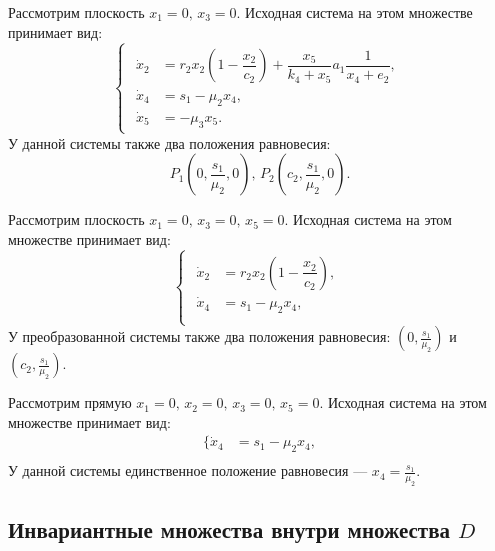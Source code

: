 \documentclass[14pt,a4paper]{extarticle}
\begin{document}
	Рассмотрим плоскость $x_1=0,\, x_3=0$. Исходная система на этом множестве принимает вид:
	\begin{equation*}
		\begin{cases}
			\begin{aligned}
				\dot{x}_2 &= r_2x_2\left(1-\dfrac{x_2}{c_2}\right)+\dfrac{x_5}{k_4+x_5}a_1\dfrac{1}{x_4+e_2},\\
				\dot{x}_4 &= s_1 -\mu_2x_4,\\
				\dot{x}_5 &= -\mu_3x_5.
			\end{aligned}
		\end{cases}
	\end{equation*}
	У данной системы также два положения равновесия:
	\[P_1\left(0,\frac{s_1}{\mu_2},0\right),\, P_2\left(c_2,\frac{s_1}{\mu_2},0\right).\]
	
	Рассмотрим плоскость $x_1=0,\, x_3=0,\, x_5=0$. Исходная система на этом множестве принимает вид:
	\begin{equation*}
		\begin{cases}
			\begin{aligned}
				\dot{x}_2 &= r_2x_2\left(1-\dfrac{x_2}{c_2}\right),\\
				\dot{x}_4 &= s_1 -\mu_2x_4,\\
			\end{aligned}
		\end{cases}
	\end{equation*}
	У преобразованной системы также два положения равновесия: $\left(0,\frac{s_1}{\mu_2}\right)$ и $\left(c_2,\frac{s_1}{\mu_2}\right)$.
	
	Рассмотрим прямую $x_1=0,\, x_2=0,\, x_3=0,\, x_5=0$. Исходная система на этом множестве принимает вид:
	\begin{equation*}
		\begin{aligned}
			\{\dot{x}_4 &= s_1 -\mu_2x_4,\\
		\end{aligned}
	\end{equation*}
	У данной системы единственное положение равновесия --- $x_4=\frac{s_1}{\mu_2}$.
	
	\subsection{Инвариантные множества внутри множества $D$}
	
\end{document}
